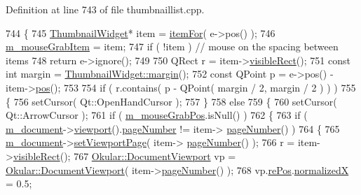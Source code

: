 Definition at line 743 of file thumbnaillist.\+cpp.


\begin{DoxyCode}
744 \{
745     \hyperlink{classThumbnailWidget}{ThumbnailWidget}* item = \hyperlink{classThumbnailListPrivate_aa6c59ee38d152b0f0fd8e1c0883b1418}{itemFor}( e->pos() );
746     \hyperlink{classThumbnailListPrivate_afd4652d135d2e87a4e10774e9cd73694}{m\_mouseGrabItem} = item;
747     \textcolor{keywordflow}{if} ( !item ) \textcolor{comment}{// mouse on the spacing between items}
748         \textcolor{keywordflow}{return} e->ignore();
749 
750     QRect r = item->\hyperlink{classThumbnailWidget_a0258d51d26bdcf3b645514239768e1c7}{visibleRect}();
751     \textcolor{keyword}{const} \textcolor{keywordtype}{int} margin = \hyperlink{classThumbnailWidget_a0837afdc1f853e05f18fbaf663cda818}{ThumbnailWidget::margin}();
752     \textcolor{keyword}{const} QPoint p = e->pos() - item->\hyperlink{classThumbnailWidget_a9c5628545df5720e6c2e03d481b6763b}{pos}();
753 
754     \textcolor{keywordflow}{if} ( r.contains( p - QPoint( margin / 2, margin / 2 ) ) )
755     \{
756         setCursor( Qt::OpenHandCursor );
757     \}
758     \textcolor{keywordflow}{else}
759     \{
760         setCursor( Qt::ArrowCursor );
761         \textcolor{keywordflow}{if} ( \hyperlink{classThumbnailListPrivate_a0ee603709d00ac6ecfbf3298baabdd20}{m\_mouseGrabPos}.isNull() )
762         \{
763             \textcolor{keywordflow}{if} ( \hyperlink{classThumbnailListPrivate_ae19b3e09f87437e8d485d0e039a52b08}{m\_document}->\hyperlink{classOkular_1_1Document_abb8738de0a53aa4a9f552de0e1e749f8}{viewport}().\hyperlink{classOkular_1_1DocumentViewport_a122674d4a493e79b1aa5fd5c00e81c93}{pageNumber} != item->
      \hyperlink{classThumbnailWidget_a1f2c0aa21032cb62975ce0f77e9e4ee3}{pageNumber}() )
764             \{
765                 \hyperlink{classThumbnailListPrivate_ae19b3e09f87437e8d485d0e039a52b08}{m\_document}->\hyperlink{classOkular_1_1Document_ac3bdbd5137c7fd4d5e960646affc25ec}{setViewportPage}( item->
      \hyperlink{classThumbnailWidget_a1f2c0aa21032cb62975ce0f77e9e4ee3}{pageNumber}() );
766                 r = item->\hyperlink{classThumbnailWidget_a0258d51d26bdcf3b645514239768e1c7}{visibleRect}();
767                 \hyperlink{classOkular_1_1DocumentViewport}{Okular::DocumentViewport} vp = 
      \hyperlink{classOkular_1_1DocumentViewport}{Okular::DocumentViewport}( item->\hyperlink{classThumbnailWidget_a1f2c0aa21032cb62975ce0f77e9e4ee3}{pageNumber}() );
768                 vp.\hyperlink{classOkular_1_1DocumentViewport_a054f24bcba44b795a3671ac53693ff45}{rePos}.\hyperlink{classOkular_1_1DocumentViewport_a2f749d09360cca2f64af1a893a190e2f}{normalizedX} = 0.5;

\end{DoxyCode}
